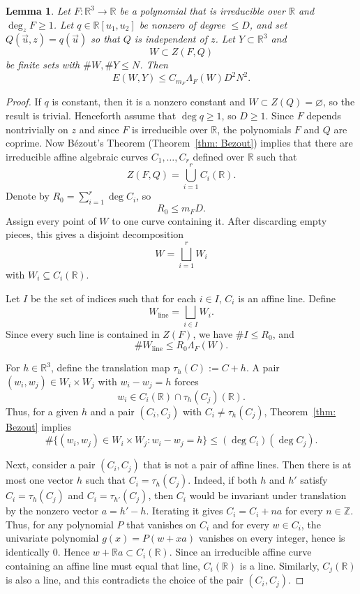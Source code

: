 \documentclass[10pt,a4paper]{amsart}
\newtheorem{lemma}{Lemma}
\newcommand{\R}{\mathbb{R}}
\newcommand{\ZR}{\mathbb{R}}
\begin{document}
\begin{lemma}
\label{lem: wall energy} 
Let $F:\ZR^3\to\ZR$ be a polynomial that is irreducible over $\ZR$ and $\deg_z F\ge 1$. 
Let $q\in\R[u_1,u_2]$ be nonzero of degree $\leq D$,  and set $Q(\vec{u},z)=q(\vec{u})$ so that $Q$ is independent of $z$. 
Let $Y\subset \ZR^3$ and
\[
    W\subset Z(F,Q)
\]
be finite sets with $\#W,\#Y\leq N$. 
Then
\begin{equation}
\label{eq:wall-energy}
    E(W,Y)\leq C_{m_F}\Lambda_{F}(W)D^2N^2.
\end{equation}
\end{lemma}

\begin{proof}
If $q$ is constant, then it is a nonzero constant and $W\subset Z(Q)=\varnothing$, so the result is trivial.
Henceforth assume that $\deg q\ge1$, so $D\geq 1$.
Since $F$ depends nontrivially on $z$ and since $F$ is irreducible over $\R$, the polynomials $F$ and $Q$ are coprime.
Now B\'ezout's Theorem (Theorem~\ref{thm: Bezout}) implies that there are irreducible affine algebraic curves $C_1,\dots,C_r$ defined over $\R$ such that
\[
    Z(F,Q)=\bigcup_{i=1}^rC_i(\R).
\]
Denote by $R_0 = \sum_{i=1}^r\deg C_i$, so 
\[
    R_0\leq m_FD.
\]
Assign every point of $W$ to one curve containing it.  
After discarding empty pieces, this gives a disjoint decomposition
\[
    W=\bigsqcup_{i=1}^r W_i
\]
with $W_i\subseteq C_i(\R)$. 

\smallskip

Let $I$ be the set of indices such that for each $i\in I$, $C_i$ is an affine line. 
Define
\[
    W_{\mathrm{line}}=\bigsqcup_{i\in I}W_i.
\]
Since every such line is contained in $Z(F)$, we have $\#I\leq R_0$, and
\begin{equation}
\label{eq: wall line points}
    \#W_{\mathrm{line}}\leq R_0\Lambda_{ F}(W).
\end{equation}


\smallskip

For $h\in\R^3$, define the translation map $\tau_h(C):=C+h$.  
A pair $(w_i,w_j)\in W_i\times W_j$ with $w_i-w_j=h$ forces
\[
    w_i\in C_i(\R)\cap\tau_h(C_j)(\R).
\]
Thus, for a given $h$ and a pair $(C_i, C_j)$ with $C_i\neq\tau_h(C_j)$, Theorem~\ref{thm: Bezout} implies
\begin{equation}
\label{not-translation}
    \#\{(w_i, w_j)\in W_i\times W_j: w_i-w_j=h \}\leq (\deg C_i)(\deg C_j).
\end{equation} 

Next, consider a pair $(C_i,C_j)$ that is not a pair of affine lines. 
Then there is at most one vector $h$ such that $C_i=\tau_h(C_j)$. 
Indeed, if both $h$ and $h'$ satisfy $C_i=\tau_h(C_j)$ and $C_i=\tau_{h'}(C_j)$, then $C_i$ would be invariant under translation by the nonzero vector $a=h'-h$.
Iterating it gives $C_i = C_i + na$ for every $n\in\mathbb Z$. 
Thus, for any polynomial $P$ that vanishes on $C_i$ and for every $w\in C_i$, the univariate polynomial $g(x)=P(w+xa)$ vanishes on every integer, hence is identically $0$.
Hence $w+\R a\subset C_i(\R)$.
Since an irreducible affine curve containing an affine line must equal that line, $C_i(\ZR)$ is a line.
Similarly, $C_j(\ZR)$ is also a line, and this contradicts the choice of the pair $(C_i, C_j)$. 



\end{proof}
\end{document}
